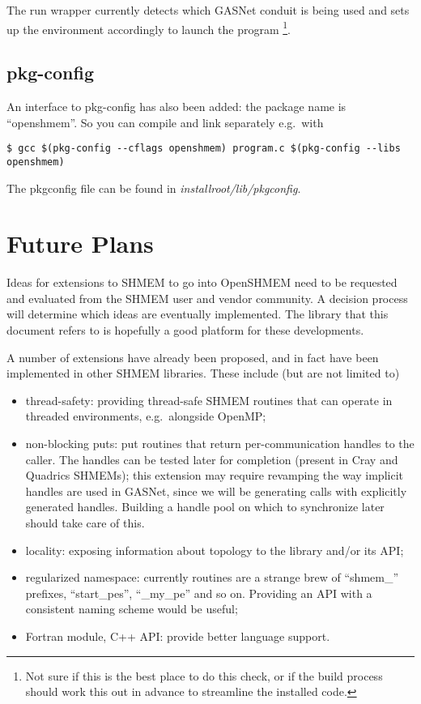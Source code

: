 \documentclass[english]{article}
\begin{document}
The run wrapper currently detects which GASNet conduit is being used
and sets up the environment accordingly to launch the program
\footnote{Not sure if this is the best place to do this check, or if
  the build process should work this out in advance to streamline the
  installed code.}.

\subsection{pkg-config}

An interface to pkg-config has also been added: the package name is
``openshmem''.  So you can compile and link separately e.g.\ with

\begin{lstlisting}
$ gcc $(pkg-config --cflags openshmem) program.c $(pkg-config --libs openshmem)
\end{lstlisting}

The pkgconfig file can be found in \emph{installroot/lib/pkgconfig}.

\section{Future Plans}

Ideas for extensions to SHMEM to go into OpenSHMEM need to be
requested and evaluated from the SHMEM user and vendor community. A
decision process will determine which ideas are eventually
implemented. The library that this document refers to is hopefully a
good platform for these developments.

A number of extensions have already been proposed, and in fact have
been implemented in other SHMEM libraries. These include (but are not
limited to)

\begin{itemize}
\item thread-safety: providing thread-safe SHMEM routines that can
operate in threaded environments, e.g.\ alongside OpenMP;
\item non-blocking puts: put routines that return per-communication
handles to the caller. The handles can be tested later for completion
(present in Cray and Quadrics SHMEMs); this extension may require
revamping the way implicit handles are used in GASNet, since we will
be generating calls with explicitly generated handles. Building a
handle pool on which to synchronize later should take care of this.
\item locality: exposing information about topology to the library
and/or its API;
\item regularized namespace: currently routines are a strange brew of
``shmem\_'' prefixes, ``start\_pes'', ``\_my\_pe'' and so
on. Providing an API with a consistent naming scheme would be useful;
\item Fortran module, C++ API: provide better language support.
\end{itemize}
\end{document}
